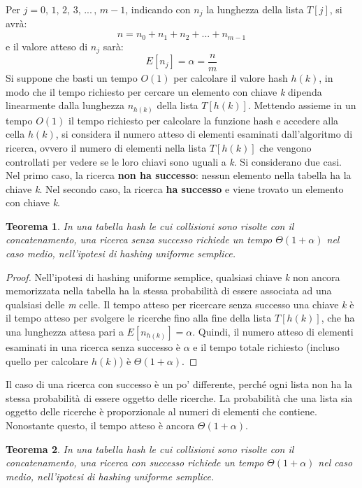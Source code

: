 \documentclass[10pt, a4paper]{report}
\newtheorem{theorem}{Teorema}[chapter]
\begin{document}
Per $j = 0,\,1,\,2,\,3,\,...\,,\,m - 1$, indicando con $n_j$ la lunghezza della lista $T[j]$, si avrà:
\begin{equation*}
n = n_0 + n_1 + n_2 + ... + n_{m-1}
\end{equation*}
e il valore atteso di $n_j$ sarà:
\begin{equation*}
E[n_j] = \alpha = \frac{n}{m}
\end{equation*}
Si suppone che basti un tempo $O(1)$ per calcolare il valore hash $h(k)$, in modo che il tempo richiesto per cercare un elemento con chiave \textit{k} dipenda linearmente dalla lunghezza $n_{h(k)}$ della lista $T[h(k)]$. Mettendo assieme in un tempo $O(1)$ il tempo richiesto per calcolare la funzione hash e accedere alla cella $h(k)$, si considera il numero atteso di elementi esaminati dall'algoritmo di ricerca, ovvero il numero di elementi nella lista $T[h(k)]$ che vengono controllati per vedere se le loro chiavi sono uguali a \textit{k}. Si considerano due casi. Nel primo caso, la ricerca \textbf{non ha successo}: nessun elemento nella tabella ha la chiave \textit{k}. Nel secondo caso, la ricerca \textbf{ha successo} e viene trovato un elemento con chiave \textit{k}.
\begin{theorem}
In una tabella hash le cui collisioni sono risolte con il concatenamento, una ricerca senza successo richiede un tempo $\Theta(1 + \alpha)$ nel caso medio, nell'ipotesi di hashing uniforme semplice.
\end{theorem}
\begin{proof}
Nell'ipotesi di hashing uniforme semplice, qualsiasi chiave \textit{k} non ancora memorizzata nella tabella ha la stessa probabilità di essere associata ad una qualsiasi delle \textit{m} celle. Il tempo atteso per ricercare senza successo una chiave \textit{k} è il tempo atteso per svolgere le ricerche fino alla fine della lista $T[h(k)]$, che ha una lunghezza attesa pari a $E[n_{h(k)}] = \alpha$. Quindi, il numero atteso di elementi esaminati in una ricerca senza successo è $\alpha$ e il tempo totale richiesto (incluso quello per calcolare $h(k)$) è $\Theta(1 + \alpha)$.
\end{proof}
Il caso di una ricerca con successo è un po' differente, perché ogni lista non ha la stessa probabilità di essere oggetto delle ricerche. La probabilità che una lista sia oggetto delle ricerche è proporzionale al numeri di elementi che contiene. Nonostante questo, il tempo atteso è ancora $\Theta(1 + \alpha)$.
\begin{theorem}
In una tabella hash le cui collisioni sono risolte con il concatenamento, una ricerca con successo richiede un tempo $\Theta(1 + \alpha)$ nel caso medio, nell'ipotesi di hashing uniforme semplice.
\end{theorem}
\end{document}
